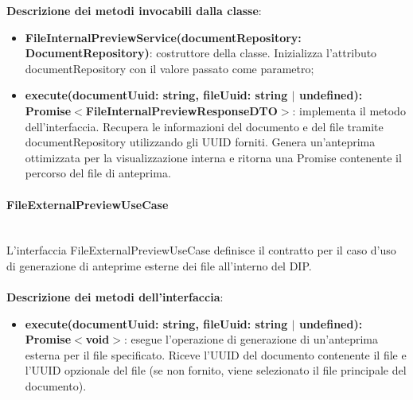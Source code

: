 \documentclass[a4paper,12pt]{article}
\begin{document}
{{              \noindent \textbf{Descrizione dei metodi invocabili dalla classe}:
                \begin{itemize}
                    \item \textbf{FileInternalPreviewService(documentRepository: DocumentRepository)}: costruttore della classe. Inizializza l'attributo documentRepository con il valore passato come parametro;
                    \item \textbf{execute(documentUuid: string, fileUuid: string $|$ undefined):\\ Promise$<$FileInternalPreviewResponseDTO$>$}: implementa il metodo dell'interfaccia. Recupera le informazioni del documento e del file tramite documentRepository utilizzando gli UUID forniti. Genera un'anteprima ottimizzata per la visualizzazione interna e ritorna una Promise contenente il percorso del file di anteprima.
                \end{itemize}
                \paragraph{FileExternalPreviewUseCase}\label{par:FileExternalPreviewUseCase}\mbox{}\\
                L'interfaccia FileExternalPreviewUseCase definisce il contratto per il caso d'uso di generazione di anteprime esterne dei file all'interno del DIP.\\
                \\
              \noindent \textbf{Descrizione dei metodi dell'interfaccia}:
                \begin{itemize}
                    \item \textbf{execute(documentUuid: string, fileUuid: string $|$ undefined):\\ Promise$<$void$>$}: esegue l'operazione di generazione di un'anteprima esterna per il file specificato. Riceve l'UUID del documento contenente il file e l'UUID opzionale del file (se non fornito, viene selezionato il file principale del documento).
                \end{itemize}
}}
\end{document}
